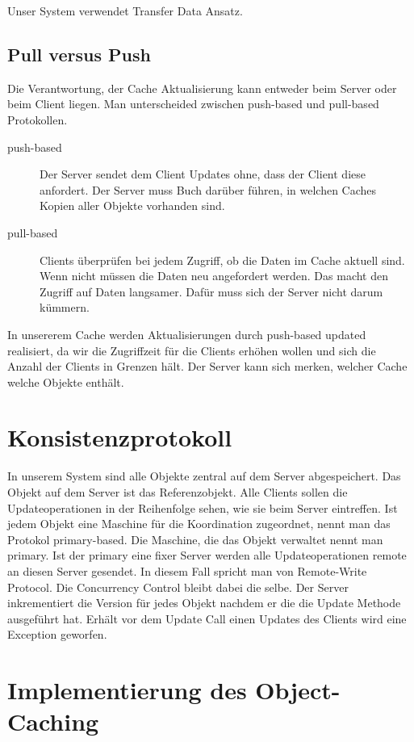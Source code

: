 Unser System verwendet Transfer Data Ansatz.

\subsection{Pull versus Push}
\label{sec:pull-versus-push}

Die Verantwortung, der Cache Aktualisierung kann entweder beim Server oder beim Client liegen. Man unterscheided zwischen push-based und pull-based Protokollen.

\begin{description}
\item[push-based] Der Server sendet dem Client Updates ohne, dass der Client diese anfordert. Der Server muss Buch darüber führen, in welchen Caches Kopien aller Objekte vorhanden sind.
\item[pull-based] Clients überprüfen bei jedem Zugriff, ob die Daten im Cache aktuell sind. Wenn nicht müssen die Daten neu angefordert werden. Das macht den Zugriff auf Daten langsamer. Dafür muss sich der Server nicht darum kümmern.
\end{description}

In unsererem Cache werden Aktualisierungen durch push-based updated realisiert, da wir die Zugriffzeit für die Clients erhöhen wollen und sich die Anzahl der Clients in Grenzen hält. Der Server kann sich merken, welcher Cache welche Objekte enthält.

\section{Konsistenzprotokoll}
\label{sec:konsistenzprotokoll}

In unserem System sind alle Objekte zentral auf dem Server abgespeichert. Das Objekt auf dem Server ist das Referenzobjekt. Alle Clients sollen die Updateoperationen in der Reihenfolge sehen, wie sie beim Server eintreffen. Ist jedem Objekt eine Maschine für die Koordination zugeordnet, nennt man das Protokol primary-based. Die Maschine, die das Objekt verwaltet nennt man primary. Ist der primary eine fixer Server werden alle Updateoperationen remote an diesen Server gesendet. In diesem Fall spricht man von Remote-Write Protocol. Die Concurrency Control bleibt dabei die selbe. Der Server inkrementiert die Version für jedes Objekt nachdem er die die Update Methode ausgeführt hat. Erhält vor dem Update Call einen Updates des Clients wird eine Exception geworfen.

\section{Implementierung des Object-Caching}
\label{sec:impl-object-kons}

